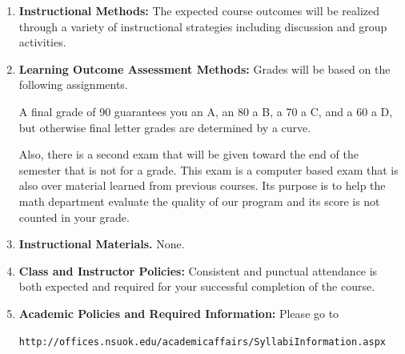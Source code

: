 \documentclass{article}
\begin{document}
\begin{enumerate}
\item \textbf{Instructional Methods:} The expected course outcomes will be realized through a variety of instructional strategies including discussion and group activities.


\item \textbf{Learning Outcome Assessment Methods:} Grades will be based on the following assignments.
A final grade of 90 guarantees you an A, an 80 a B, a 70 a C, and a 60 a D, but otherwise final letter grades are determined by a curve.

Also, there is a second exam that will be given toward the end of the semester that is not for a grade. This exam is a computer based exam that is also over material learned from previous courses. Its purpose is to help the math department evaluate the quality of our program and its score is not counted in your grade.


\item \textbf{Instructional Materials.} None.


\item \textbf{Class and Instructor Policies:} Consistent and punctual attendance is both expected and required for your successful completion of the course.


\item \textbf{Academic Policies and Required Information:} Please go to 

\begin{center}
\texttt{http://offices.nsuok.edu/academicaffairs/SyllabiInformation.aspx}
\end{center}


\end{enumerate}
\end{document}
